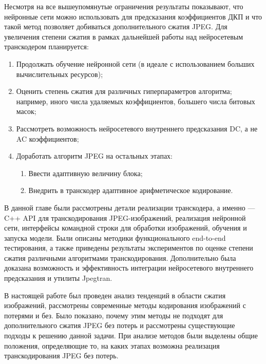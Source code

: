 \documentclass[times,specification,annotation]{itmo-student-thesis}
\begin{document}
Несмотря на все вышеупомянутые ограничения результаты показывают, что нейронные сети можно использовать для предсказания коэффициентов ДКП и что такой метод позволяет добиваться дополнительного сжатия JPEG. Для увеличения степени сжатия в рамках дальнейшей работы над нейросетевым транскодером планируется:
\begin{enumerate}
    \item Продолжать обучение нейронной сети (в идеале с использованием больших вычислительных ресурсов);
    \item Оценить степень сжатия для различных гиперпараметров алгоритма; например, иного числа удаляемых коэффициентов, большего числа битовых масок;
    \item Рассмотреть возможность нейросетевого внутреннего предсказания DC, а не AC коэффициентов;
    \item Доработать алгоритм JPEG на остальных этапах:
          \begin{enumerate}
              \item Ввести адаптивную величину блока;
              \item Внедрить в транскодер адаптивное арифметическое кодирование.
          \end{enumerate}
\end{enumerate}

\chapterconclusion

В данной главе были рассмотрены детали реализации транскодера, а именно --- C++ API для транскодирования JPEG-изображений, реализация нейронной сети, интерфейсы командной строки для обработки изображений, обучения и запуска модели. Были описаны методики функционального end-to-end тестирования, а также приведены результаты экспериментов по оценке степени сжатия различными алгоритмами транскодирования. Дополнительно была доказана возможность и эффективность интеграции нейросетевого внутреннего предсказания и утилиты Jpegtran.

\startconclusionpage

В настоящей работе был проведен анализ тенденций в области сжатия изображений, рассмотрены современные методы кодирования изображений с потерями и без. Было показано, почему этим методы не подходят для дополнительного сжатия JPEG без потерь и рассмотрены существующие подходы к решению данной задачи. При анализе методов были выделены общие положения, определяющие то, на каких этапах возможна реализация транскодирования JPEG без потерь.\par
\end{document}
